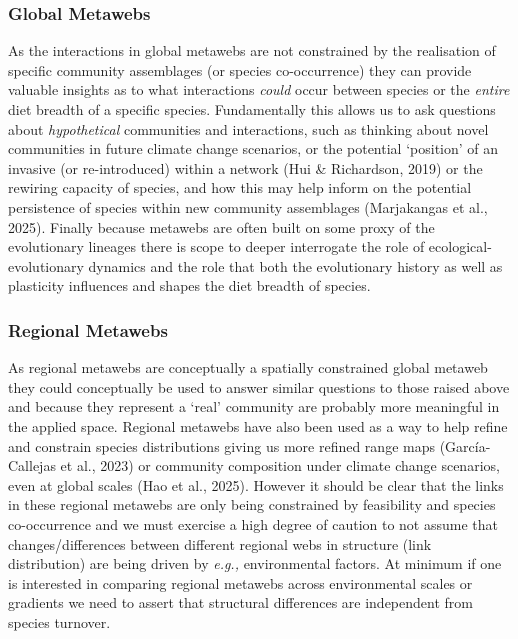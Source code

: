 \documentclass[
]{article}
\begin{document}
\subsubsection{Global Metawebs}\label{global-metawebs}

As the interactions in global metawebs are not constrained by the
realisation of specific community assemblages (or species co-occurrence)
they can provide valuable insights as to what interactions \emph{could}
occur between species or the \emph{entire} diet breadth of a specific
species. Fundamentally this allows us to ask questions about
\emph{hypothetical} communities and interactions, such as thinking about
novel communities in future climate change scenarios, or the potential
`position' of an invasive (or re-introduced) within a network (Hui \&
Richardson, 2019) or the rewiring capacity of species, and how this may
help inform on the potential persistence of species within new community
assemblages (Marjakangas et al., 2025). Finally because metawebs are
often built on some proxy of the evolutionary lineages there is scope to
deeper interrogate the role of ecological-evolutionary dynamics and the
role that both the evolutionary history as well as plasticity influences
and shapes the diet breadth of species.

\subsubsection{Regional Metawebs}\label{regional-metawebs}

As regional metawebs are conceptually a spatially constrained global
metaweb they could conceptually be used to answer similar questions to
those raised above and because they represent a `real' community are
probably more meaningful in the applied space. Regional metawebs have
also been used as a way to help refine and constrain species
distributions giving us more refined range maps (García-Callejas et al.,
2023) or community composition under climate change scenarios, even at
global scales (Hao et al., 2025). However it should be clear that the
links in these regional metawebs are only being constrained by
feasibility and species co-occurrence and we must exercise a high degree
of caution to not assume that changes/differences between different
regional webs in structure (link distribution) are being driven by
\emph{e.g.,} environmental factors. At minimum if one is interested in
comparing regional metawebs across environmental scales or gradients we
need to assert that structural differences are independent from species
turnover.
\end{document}
